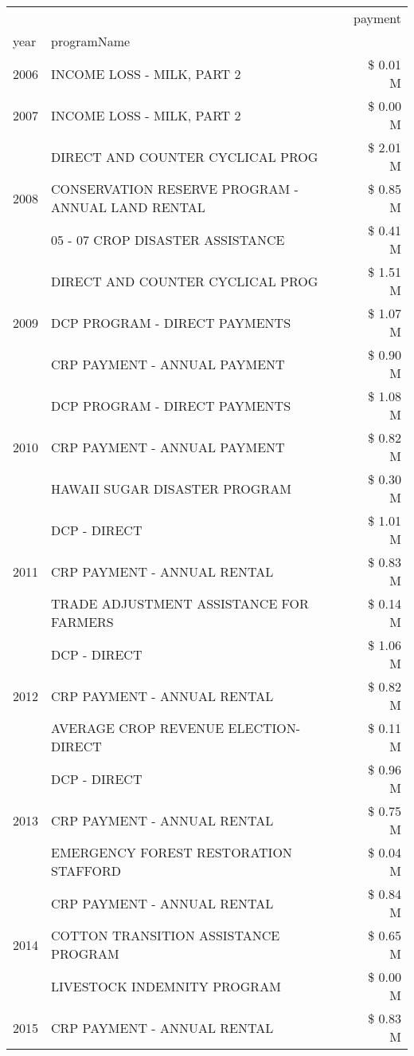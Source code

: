 \begin{tabular}{llr}
\toprule
 &  & payment \\
year & programName &  \\
\midrule
2006 & INCOME LOSS - MILK, PART 2 & \$ 0.01 M \\
\cline{1-3}
2007 & INCOME LOSS - MILK, PART 2 & \$ 0.00 M \\
\cline{1-3}
\multirow[t]{3}{*}{2008} & DIRECT AND COUNTER CYCLICAL PROG & \$ 2.01 M \\
 & CONSERVATION RESERVE PROGRAM - ANNUAL LAND RENTAL & \$ 0.85 M \\
 & 05 - 07 CROP DISASTER ASSISTANCE & \$ 0.41 M \\
\cline{1-3}
\multirow[t]{3}{*}{2009} & DIRECT AND COUNTER CYCLICAL PROG & \$ 1.51 M \\
 & DCP PROGRAM - DIRECT PAYMENTS & \$ 1.07 M \\
 & CRP PAYMENT - ANNUAL PAYMENT & \$ 0.90 M \\
\cline{1-3}
\multirow[t]{3}{*}{2010} & DCP PROGRAM - DIRECT PAYMENTS & \$ 1.08 M \\
 & CRP PAYMENT - ANNUAL PAYMENT & \$ 0.82 M \\
 & HAWAII SUGAR DISASTER PROGRAM & \$ 0.30 M \\
\cline{1-3}
\multirow[t]{3}{*}{2011} & DCP - DIRECT & \$ 1.01 M \\
 & CRP PAYMENT - ANNUAL RENTAL & \$ 0.83 M \\
 & TRADE ADJUSTMENT ASSISTANCE FOR FARMERS & \$ 0.14 M \\
\cline{1-3}
\multirow[t]{3}{*}{2012} & DCP - DIRECT & \$ 1.06 M \\
 & CRP PAYMENT - ANNUAL RENTAL & \$ 0.82 M \\
 & AVERAGE CROP REVENUE ELECTION-DIRECT & \$ 0.11 M \\
\cline{1-3}
\multirow[t]{3}{*}{2013} & DCP - DIRECT & \$ 0.96 M \\
 & CRP PAYMENT - ANNUAL RENTAL & \$ 0.75 M \\
 & EMERGENCY FOREST RESTORATION STAFFORD & \$ 0.04 M \\
\cline{1-3}
\multirow[t]{3}{*}{2014} & CRP PAYMENT - ANNUAL RENTAL & \$ 0.84 M \\
 & COTTON TRANSITION ASSISTANCE PROGRAM & \$ 0.65 M \\
 & LIVESTOCK INDEMNITY PROGRAM & \$ 0.00 M \\
\cline{1-3}
\multirow[t]{3}{*}{2015} & CRP PAYMENT - ANNUAL RENTAL & \$ 0.83 M \\

\end{tabular}

